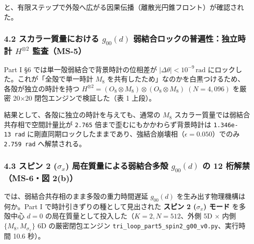\documentclass[
  a4paper,
]{ltjsarticle}
\begin{document}
と、有限ステップで外殻へ広がる因果伝播（離散光円錐フロント）が確認された。

\subsubsection{\texorpdfstring{4.2 スカラー質量における \(g_{00}(d)\)
弱結合ロックの普遍性：独立時計 \(H^{\otimes 2}\)
監査（MS-5）}{4.2 スカラー質量における g\_\{00\}(d) 弱結合ロックの普遍性：独立時計 H\^{}\{\textbackslash otimes 2\} 監査（MS-5）}}\label{ux30b9ux30abux30e9ux30fcux8ceaux91cfux306bux304aux3051ux308b-g_00d-ux5f31ux7d50ux5408ux30edux30c3ux30afux306eux666eux904dux6027ux72ecux7acbux6642ux8a08-hotimes-2-ux76e3ux67fbms-5}

Part I §6 では単一殻弱結合で背景時計の位相差が
\(|\Delta\theta| < 10^{-9}\,\mathrm{rad}\)
にロックした。これが「全殻で単一時計 \(M_8\)
を共有したため」なのかを白黒つけるため、各殻が独立の時計を持つ
\textbf{\(H^{\otimes 2} = (O_8\otimes M_8) \otimes (O_8\otimes M_8)\;(N=4{,}096)\)}
を厳密 20×20 閉包エンジンで検証した（表 1 上段）。

結果として、各殻に独立の時計を与えても、通常の \(M_8\)
スカラー質量では弱結合共存相で空間計量比が \texttt{2.765}
倍まで歪むにもかかわらず背景時計は \texttt{1.346e-13\ rad}
に剛直同期ロックしたままであり、強結合崩壊相（\(\epsilon = 0.050\)）でのみ
\texttt{2.759\ rad} へ解禁される。

\subsubsection{\texorpdfstring{4.3 スピン 2 (\(\sigma_x\))
局在質量による弱結合多殻 \(g_{00}(d)\) の 12 桁解禁（MS-6・図
2(b)）}{4.3 スピン 2 (\textbackslash sigma\_x) 局在質量による弱結合多殻 g\_\{00\}(d) の 12 桁解禁（MS-6・図 2(b)）}}\label{ux30b9ux30d4ux30f3-2-sigma_x-ux5c40ux5728ux8ceaux91cfux306bux3088ux308bux5f31ux7d50ux5408ux591aux6bbb-g_00d-ux306e-12-ux6841ux89e3ux7981ms-6ux56f3-2b}

では、弱結合共存相のまま多殻の重力時間遅延 \(g_{00}(d)\)
を生み出す物理機構は何か。Part I で時計引きずりの種として見出された
\textbf{スピン 2 (\(\sigma_x\)) モード} を多殻中心 \(d=0\)
の局在質量として投入した（\(K=2, N=512\)、外側 5D × 内側
\(\{M_8, M_{\sigma_x}\}\) 6D の厳密閉包エンジン
\texttt{tri\_loop\_part5\_spin2\_g00\_v0.py}、実行時間 10.6 秒）。
\end{document}
